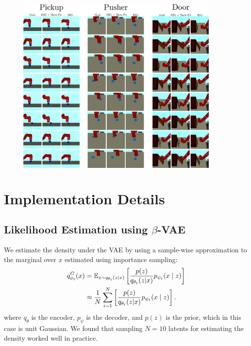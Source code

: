 \begin{figure}
    \centering
    \includegraphics[width=0.9\textwidth]{figures/example-rollouts.jpg}
    \label{fig:example_rollouts}
\end{figure}

\section{Implementation Details}\label{sec:implementation-details}

\subsection{Likelihood Estimation using $\beta$-VAE}\label{sec:likelihood-estimation-vae}
We estimate the density under the VAE by using a sample-wise approximation to the marginal over $x$ estimated using importance sampling:
\begin{align*}
    {q^G_{{\phi}_t}}(x) &= \mathbb E_{z \sim q_{\theta_t}(z|x)} \left[\frac{p(z)}{q_{\theta_t}(z|x)} p_{\psi_t}(x \mid z) \right]  \\
    &\approx \frac{1}{N} \sum_{i=1}^{N} \left[\frac{p(z)}{q_{\theta_t}(z|x)} p_{\psi_t}(x \mid z) \right].
\end{align*}
where $q_{\theta}$ is the encoder, $p_\psi$ is the decoder, and $p(z)$ is the prior, which in this case is unit Gaussian.
We found that sampling $N=10$ latents for estimating the density worked well in practice.

